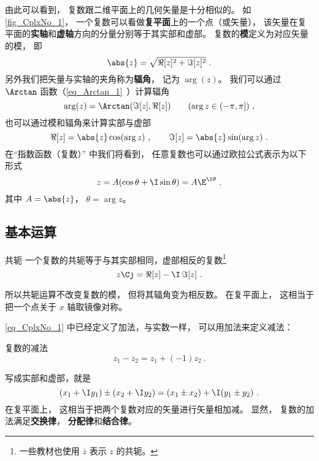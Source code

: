 由此可以看到， 复数跟二维平面上的几何矢量是十分相似的。 如\autoref{fig_CplxNo_1}， 一个复数可以看做\textbf{复平面}上的一个点（或矢量）， 该矢量在复平面的\textbf{实轴}和\textbf{虚轴}方向的分量分别等于其实部和虚部。 复数的\textbf{模}定义为对应矢量的模， 即
\begin{equation}
\abs{z} = \sqrt{\Re[z]^2 + \Im[z]^2}~.
\end{equation}
另外我们把矢量与实轴的夹角称为\textbf{辐角}， 记为 $\arg(z)$。 我们可以通过 $\Arctan$ 函数（\autoref{eq_Arctan_1}~）计算辐角
\begin{equation}\label{eq_CplxNo_5}
\arg(z) = \Arctan(\Im[z], \Re[z])
\qquad (\arg z \in (-\pi, \pi])~,
\end{equation}
也可以通过模和辐角来计算实部与虚部
\begin{equation}
\Re[z] = \abs{z}\cos(\arg z)~, \qquad \Im[z] = \abs{z}\sin(\arg z)~.
\end{equation}
在“指数函数（复数）” 中我们将看到， 任意复数也可以通过欧拉公式表示为以下形式
\begin{equation}
z = A(\cos\theta + \I\sin\theta) = A\E^{\I\theta}~.
\end{equation}
其中 $A = \abs{z}$， $\theta = \arg z$。

\subsection{基本运算}
\begin{definition}{共轭}
一个复数的共轭等于与其实部相同，虚部相反的复数\footnote{一些教材也使用 $\bar z$ 表示 $z$ 的共轭。}
\begin{equation}\label{eq_CplxNo_6}
z\Cj = \Re[z] - \I\, \Im[z]~.
\end{equation}
\end{definition}
所以共轭运算不改变复数的模， 但将其辐角变为相反数。 在复平面上， 这相当于把一个点关于 $x$ 轴取镜像对称。

\autoref{eq_CplxNo_1} 中已经定义了加法，与实数一样， 可以用加法来定义减法：
\begin{definition}{复数的减法}
\begin{equation}
z_1 - z_2 = z_1 + (-1)z_2~.
\end{equation}
\end{definition}
写成实部和虚部，就是
\begin{equation}
(x_1 + \I y_1) \pm (x_2 + \I y_2) = (x_1 \pm x_2) + \I (y_1 \pm y_2)~.
\end{equation}
在复平面上， 这相当于把两个复数对应的矢量进行矢量相加减。 显然， 复数的加法满足\textbf{交换律}， \textbf{分配律}和\textbf{结合律}。

